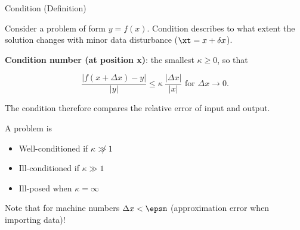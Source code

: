 \documentclass[11pt,compress,t,notes=noshow, xcolor=table]{beamer}
\begin{document}
\begin{vbframe}{Condition (Definition)}

Consider a problem of form $y = f(x)$. Condition describes to what extent the solution changes with minor data disturbance ($\xt = x + \delta x$).

\lz

\textbf{Condition number (at position x)}: the smallest $\kappa \geq 0$, so that

$$
\frac{|f(x+\Delta x)-y|}{|y|} \leq \kappa \ \frac{|\Delta x|}{|x|} \text{ for } \Delta x \to 0.
$$

The condition therefore compares the relative error of input and output.

A problem is

\begin{itemize}
\item Well-conditioned if $\kappa \not \gg 1$
\item Ill-conditioned if $\kappa \gg 1$
\item Ill-posed when $\kappa = \infty$
\end{itemize}

\begin{footnotesize}
Note that for machine numbers $\Delta x < \epsm$ (approximation error when importing data)!
\end{footnotesize}


\end{vbframe}
\end{document}
